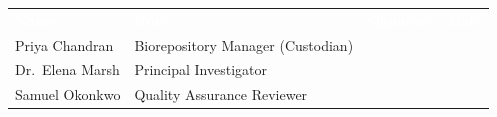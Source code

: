 \vspace{0.6em}
\begin{center}
\renewcommand{\arraystretch}{1.4}
\begin{tabularx}{0.85\linewidth}{@{}X l X l@{}}
\rowcolor{freezerblue}
\textcolor{white}{\textbf{Name}} & \textcolor{white}{\textbf{Role}} & \textcolor{white}{\textbf{Signature}} & \textcolor{white}{\textbf{Date}} \\
Priya Chandran & Biorepository Manager (Custodian) & & \\
Dr.\ Elena Marsh & Principal Investigator & & \\
Samuel Okonkwo & Quality Assurance Reviewer & & \\
\end{tabularx}
\end{center}
